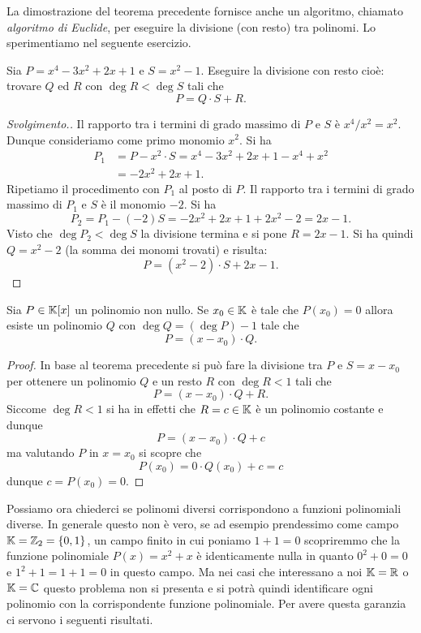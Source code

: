   La dimostrazione del teorema precedente fornisce anche un
  algoritmo, chiamato \emph{algoritmo di Euclide},
  per eseguire la divisione (con resto) tra polinomi.
  Lo sperimentiamo nel seguente esercizio.
  
  \begin{exercise}
  Sia $P = x^4-3 x^2 + 2x + 1$ e $S = x^2-1$.
  Eseguire la divisione con resto cioè:
  trovare $Q$ ed $R$ con $\deg R < \deg S$ tali che
  \[
  P = Q \cdot S + R.
  \]
  \end{exercise}
  \begin{proof}[Svolgimento.]
  Il rapporto tra i termini di grado massimo di
  $P$ e $S$ è $x^4/x^2 = x^2$.
  Dunque consideriamo come primo monomio $x^2$.
  Si ha
  \begin{align*}
    P_1
    &= P - x^2 \cdot S
    = x^4-3x^2+2x+1 - x^4+x^2 \\
    &= -2x^2+2x+1.
  \end{align*}
  Ripetiamo il procedimento con $P_1$ al posto di $P$.
  Il rapporto tra i termini di grado massimo di $P_1$ e $S$
  è il monomio $-2$. Si ha
  \[
    P_2 = P_1 - (-2) S = -2x^2 + 2x + 1 + 2x^2 - 2 = 2x -1.
  \]
  Visto che $\deg P_2 < \deg S$ la divisione termina e
  si pone $R = 2x-1$.
  Si ha quindi $Q = x^2 - 2$ (la somma dei monomi trovati)
  e risulta:
  \[
    P = (x^2 - 2)\cdot S + 2x -1.
  \]
  \end{proof}
  
  \begin{theorem}[Ruffini]
  \label{th:Ruffini}%
  Sia $P\in {\mathbb K}[x]$ un polinomio non nullo.
  Se $x_0 \in {\mathbb K}$ è tale che $P(x_0)=0$
  allora esiste un polinomio $Q$ con $\deg Q = (\deg P) - 1$
  tale che
  \[
    P = (x-x_0)\cdot Q.
  \]
  \end{theorem}
  \begin{proof}
  In base al teorema precedente si può fare la divisione tra
  $P$ e $S = x - x_0$ per ottenere un polinomio $Q$ e un resto
  $R$ con $\deg R < 1$ tali che
  \[
    P = (x-x_0)\cdot Q + R.
  \]
  Siccome $\deg R < 1$ si ha in effetti che $R=c\in {\mathbb K}$
  è un polinomio costante e dunque
  \[
    P = (x-x_0) \cdot Q + c
  \]
  ma valutando $P$ in $x=x_0$ si scopre che
  \[
   P(x_0) = 0\cdot Q(x_0) + c = c
  \]
  dunque $c=P(x_0) = 0$.
  \end{proof}
  
  Possiamo ora chiederci se polinomi diversi corrispondono
  a funzioni polinomiali diverse.
  In generale questo non è vero, se ad esempio prendessimo
  come campo ${\mathbb K}={\mathbb Z}_2 = {\left\{ 0,1 \right\}}$, un campo finito
  in cui poniamo $1+1=0$ scopriremmo che la funzione polinomiale
  $P(x) = x^2+x$ è identicamente nulla in quanto $0^2+0=0$
  e $1^2+1=1+1=0$ in questo campo.
  Ma nei casi che interessano a noi ${\mathbb K}={\mathbb R}$ o ${\mathbb K}={\mathbb C}$
  questo problema non si presenta e si potrà quindi identificare
  ogni polinomio con la corrispondente funzione polinomiale.
  Per avere questa garanzia ci servono i seguenti risultati.
  
